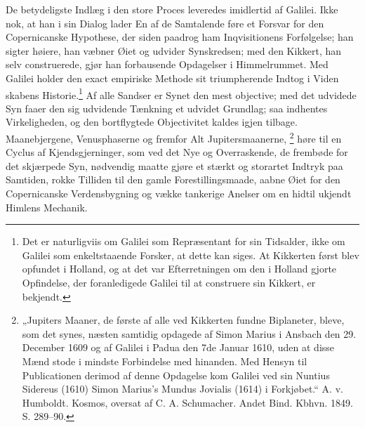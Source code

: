 \documentclass[12pt,a4paper]{book}
\renewcommand{\thefootnote}{*)}
\begin{document}
De betydeligste Indlæg i den store Proces leveredes imidlertid af
Galilei. Ikke nok, at han i sin Dialog%
\renewcommand{\thefootnote}{**)}%
\footnotemark%
\renewcommand{\thefootnote}{***)}%
%
\renewcommand{\thefootnote}{*)}
lader En af de Samtalende føre et Forsvar for den Copernicanske
Hypothese, der siden paadrog ham Inqvisitionens Forfølgelse; han sigter
høiere, han væbner Øiet og udvider Synskredsen; med den Kikkert, han
selv construerede, gjør han forbausende Opdagelser i Himmelrummet. Med
Galilei holder den exact empiriske Methode sit triumpherende Indtog i
Viden\-%
skabens Historie.\footnote{%
Det er naturligviis om Galilei som Repræsentant for sin Tidsalder, ikke
om Galilei som enkeltstaaende Forsker, at dette kan siges. At Kikkerten
først blev opfundet i Holland, og at det var Efterretningen om den i
Holland gjorte Opfindelse, der foranledigede Galilei til at construere
sin Kikkert, er bekjendt.} Af alle Sandser er Synet den mest objective;
med det udvidede Syn faaer den sig udvidende Tænkning et udvidet
Grundlag; saa indhentes Virkeligheden, og den bortflygtede Objectivitet
kaldes igjen tilbage. Maanebjergene, Venusphaserne og fremfor Alt
Jupitersmaanerne,%
\renewcommand{\thefootnote}{**)}%
\footnote{%
„Jupiters Maaner, de første af alle ved Kikkerten fundne Biplaneter,
bleve, som det synes, næsten samtidig opdagede af Simon Marius i
Ansbach den 29. December 1609 og af Galilei i Padua den 7de Januar
1610, uden at disse Mænd stode i mindste Forbindelse med hinanden. Med
Hensyn til Publicationen derimod af denne Opdagelse kom Galilei ved sin
Nuntius Sidereus (1610) Simon Marius's Mundus Jovialis (1614) i
Forkjøbet.“ A. v. Humboldt. Kosmos, oversat af C. A. Schumacher. Andet
Bind. Kbhvn. 1849. S. 289--90.}%
\renewcommand{\thefootnote}{*)}
høre til en Cyclus af Kjendsgjerninger, som ved det Nye og
Overraskende, de frembøde for det skjærpede Syn, nødvendig maatte gjøre
et stærkt og storartet Indtryk paa Samtiden, rokke Tilliden til den
gamle Forestillingsmaade, aabne Øiet for den Copernicanske
Verdensbygning og vække tankerige Anelser om en hidtil ukjendt Himlens
Mechanik.
\end{document}
